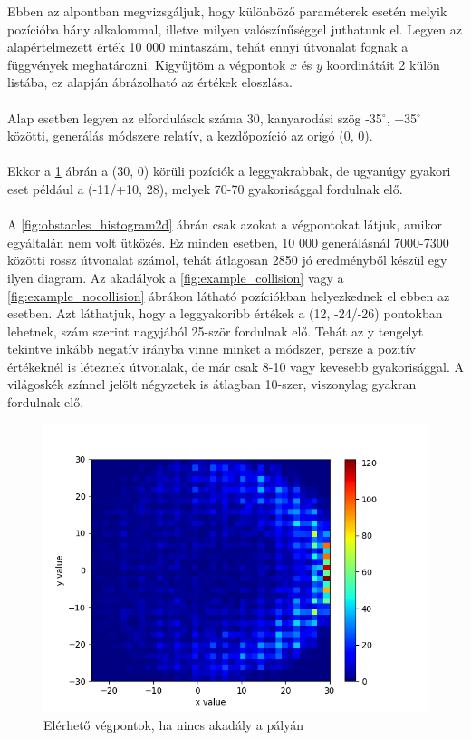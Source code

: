 Ebben az alpontban megvizsgáljuk, hogy különböző paraméterek esetén melyik pozícióba hány alkalommal, illetve milyen valószínűséggel juthatunk el. Legyen az alapértelmezett érték 10 000 mintaszám, tehát ennyi útvonalat fognak a függvények meghatározni. Kigyűjtöm a végpontok $ x $ és $ y $ koordinátáit 2 külön listába, ez alapján ábrázolható az értékek eloszlása.\\\\
Alap esetben legyen az elfordulások száma 30, kanyarodási szög -35$^{\circ}$, +35$^{\circ}$ közötti, generálás módszere relatív, a kezdőpozíció az origó (0, 0).\\\\
Ekkor a \ref{fig:no_obstacles_histogram2d} ábrán a (30, 0) körüli pozíciók a leggyakrabbak, de ugyanúgy gyakori eset például a (-11/+10, 28), melyek 70-70 gyakorisággal fordulnak elő.\\\\
A \ref{fig:obstacles_histogram2d} ábrán csak azokat a végpontokat látjuk, amikor egyáltalán nem volt ütközés. Ez minden esetben, 10 000 generálásnál 7000-7300 közötti rossz útvonalat számol, tehát átlagosan 2850 jó eredményből készül egy ilyen diagram. Az akadályok a \ref{fig:example_collision} vagy a \ref{fig:example_nocollision} ábrákon látható pozíciókban helyezkednek el ebben az esetben. Azt láthatjuk, hogy a leggyakoribb értékek a (12, -24/-26) pontokban lehetnek, szám szerint nagyjából 25-ször fordulnak elő. Tehát az y tengelyt tekintve inkább negatív irányba vinne minket a módszer, persze a pozitív értékeknél is léteznek útvonalak, de már csak 8-10 vagy kevesebb gyakorisággal. A világoskék színnel jelölt négyzetek is átlagban 10-szer, viszonylag gyakran fordulnak elő.



\begin{figure}[h!]
\centering
\includegraphics[scale=0.75]{images/no_obstacles_histogram2d.png}
\caption{Elérhető végpontok, ha nincs akadály a pályán}
\label{fig:no_obstacles_histogram2d}
\end{figure}

